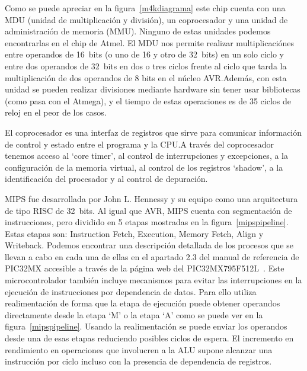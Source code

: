 Como se puede apreciar en la figura~\ref{m4kdiagrama} este chip cuenta con una MDU (unidad de multiplicación y división), un coprocesador y una unidad de administración de memoria (MMU). Ninguno de estas unidades podemos encontrarlas en el chip de Atmel. El MDU nos permite realizar multiplicaciónes entre operandos de 16~bits (o uno de 16 y otro de 32~bits) en un solo ciclo y entre dos operandos de 32~bits en dos o tres ciclos frente al ciclo que tarda la multiplicación de dos operandos de 8 bits en el núcleo AVR.\@ Además, con esta unidad se pueden realizar divisiones mediante hardware sin tener usar bibliotecas (como pasa con el Atmega), y el tiempo de estas operaciones es de 35 ciclos de reloj en el peor de los casos.


El coprocesador es una interfaz de registros que sirve para comunicar información de control y estado entre el programa y la CPU.\@ A través del coprocesador tenemos acceso al `core timer', al control de interrupciones y excepciones, a la configuración de la memoria virtual, al control de los registros `shadow', a la identificación del procesador y al control de depuración.


MIPS fue desarrollada por John L. Hennessy y su equipo como una arquitectura de tipo RISC de 32~bits. Al igual que AVR, MIPS cuenta con segmentación de instrucciones, pero dividido en 5 etapas mostradas en la figura~\ref{mipspipeline}. Estas etapas son: Instruction Fetch, Execution, Memory Fetch, Align y Writeback. Podemos encontrar una descripción detallada de los procesos que se llevan a cabo en cada una de ellas en el apartado 2.3 del manual de referencia de PIC32MX accesible a través de la página web del PIC32MX795F512L~\cite{website:pic32mx}. Este microcontrolador también incluye mecanismos para evitar las interrupciones en la ejecución de instrucciones por dependencia de datos. Para ello utiliza realimentación de forma que la etapa de ejecución puede obtener operandos directamente desde la etapa `M' o la etapa `A' como se puede ver en la figura~\ref{mipspipeline}. Usando la realimentación se puede enviar los operandos desde una de esas etapas reduciendo posibles ciclos de espera. El incremento en rendimiento en operaciones que involucren a la ALU supone alcanzar una instrucción por ciclo incluso con la presencia de dependencia de registros.

